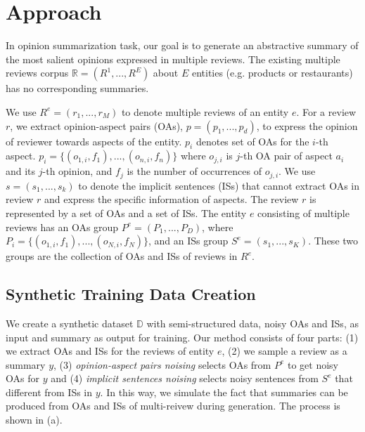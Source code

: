 \section{Approach}
\label{sec:approach}
In opinion summarization task, our goal is to generate an abstractive 
summary of the most salient opinions expressed in multiple reviews.
The existing multiple reviews corpus  $\mathbb{R}=(R^1, ..., R^E)$ about $E$ entities (e.g. products or restaurants) has no
corresponding summaries.

We use $R^e=(r_1,...,r_M)$ to denote multiple reviews of an entity $e$. 
For a review $r$, we extract opinion-aspect pairs (OAs), 
$p=(p_{1},...,p_{d})$, 
to express the  opinion of reviewer towards aspects of the entity.
$p_i$ denotes set of OAs for the $i$-th aspect.
$p_{i}=\{(o_{1,i}, f_1), ..., (o_{n,i}, f_n)\}$ where %
$o_{j,i}$ is $j$-th OA pair of aspect $a_i$ and its $j$-th opinion,
and $f_j$ is the number of occurrences of $o_{j,i}$.
We use $s=(s_1,..., s_k)$ to denote the implicit sentences (ISs) that cannot extract OAs in review $r$ and express the specific information of aspects.
The review $r$ is represented by a set of OAs and a set of ISs.
The entity $e$ consisting of multiple reviews has an OAs group $P^e=(P_{1},...,P_{D})$, 
where $P_{i}=\{(o_{1,i},f_1), ..., (o_{N, i},f_N)\}$, 
and an ISs group $S^e=(s_1,..., s_K)$. 
These two groups 
are the collection of OAs and ISs of reviews in $R^e$.


\subsection{Synthetic Training Data Creation}
\label{sec:data}

We create a synthetic dataset $\mathbb{D}$ with semi-structured data, 
noisy OAs and ISs, as input and summary as output for training. 
Our method consists of four parts: 
(1) we extract OAs and ISs for the reviews of entity $e$,
(2) we sample a review as a summary $y$, 
(3) {\em opinion-aspect pairs noising} selects OAs from $P^e$ to get noisy OAs for $y$ 
and (4) {\em implicit sentences noising} selects noisy sentences from $S^e$ 
that different from ISs in $y$.
In this way, we simulate the fact that summaries can be produced 
from OAs and ISs of multi-reivew during generation. 
The process is shown in (a).


